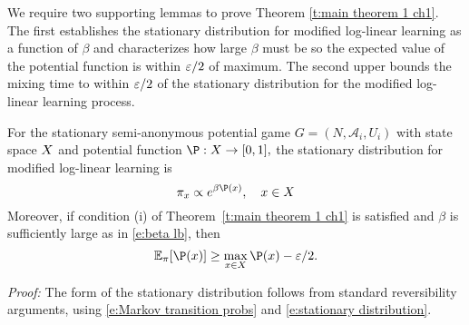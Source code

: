We require two supporting lemmas to prove Theorem \ref{t:main theorem 1 ch1}.  The first  
establishes the stationary distribution for modified log-linear learning as a function of $\beta$ and characterizes how large $\beta$ must be so the expected value of the potential function is within $\varepsilon/2$ of maximum.  The second upper bounds the mixing time to within $\varepsilon/2$ of the stationary distribution for the modified log-linear learning process.  


\begin{lemma}\label{l:stationary distribution}\label{l:beta bound}
For the stationary semi-anonymous potential game $G = (N,\mathcal{A}_i,U_i)$  %
with state space $X$ and potential function $\P: \sX \to [0,1],$
the stationary distribution for modified log-linear learning is
\begin{equation}\label{e:stationary distribution}
\pi_{x}\propto e^{\beta\P(x)}, \quad x\in  \sX
\end{equation}
Moreover, if condition (i) of Theorem~\ref{t:main theorem 1 ch1} is satisfied and $\beta$ is sufficiently large as in \eqref{e:beta lb}, then \begin{equation}\label{e:expPot}
\E_\pi[\P(x)]\geq\max_{x\in \sX}\P(x)-\eps/2.
\end{equation}
\end{lemma}

\noindent\emph{Proof:}
The form of the stationary distribution follows from standard reversibility arguments, using \eqref{e:Markov transition probs} and \eqref{e:stationary distribution}.

